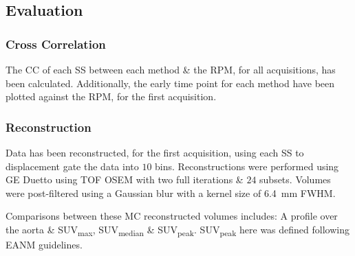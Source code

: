     
    \subsection{Evaluation} \label{sec:evaluation}
        \subsubsection{Cross Correlation} \label{sec:cross_correlation}
            The \gls{CC} of each \gls{SS} between each method \& the \gls{RPM}, for all acquisitions, has been calculated. Additionally, the early time point  for each method have been plotted against the \gls{RPM}, for the first acquisition.
        
        \subsubsection{Reconstruction} \label{sec:reconstruction}
            Data has been reconstructed, for the first acquisition, using each \gls{SS} to displacement gate the data into $10$ bins. Reconstructions were performed using \gls{GE} Duetto using \gls{TOF} \gls{OSEM} with two full iterations \& $24$ subsets.%
            Volumes were post-filtered using a Gaussian blur with a kernel size of \SI{6.4}{\milli\metre} \gls{FWHM}.
            
            Comparisons between these \gls{MC} reconstructed volumes includes: A profile over the aorta \& \gls{SUV}\textsubscript{max}, \gls{SUV}\textsubscript{median} \& \gls{SUV}\textsubscript{peak}. \gls{SUV}\textsubscript{peak} here was defined following \gls{EANM} guidelines.%
        
